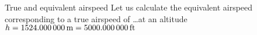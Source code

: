 \documentclass[[12pt,twoside]{book}
\begin{document}
%

%
\begin{myExampleX}{True and equivalent airspeed}{}%
\label{example:Equivalent:Airspeed:Basic:B}
%
\noindent
Let us calculate the equivalent airspeed corresponding to a true airspeed of \ldots at an altitude $h=\SI[round-precision=0]{\myAltitudeMT}{m} =\SI[round-precision=0]{\myAltitudeFT}{ft}$
\end{myExampleX}
\end{document}

